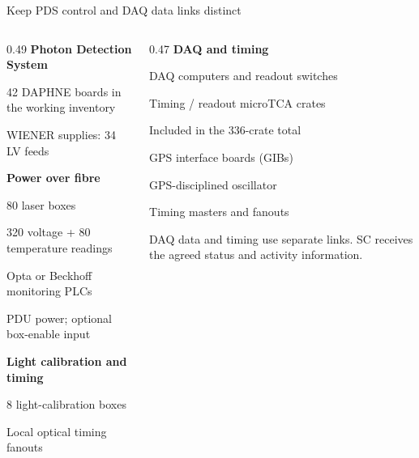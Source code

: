 \begin{frame}{Keep PDS control and DAQ data links distinct}
\small
\begin{columns}[T,onlytextwidth]
\begin{column}{0.49\textwidth}
\textbf{Photon Detection System}\par
\hspace*{0.8em}42 DAPHNE boards in the working inventory\par
\hspace*{0.8em}WIENER supplies: 34 LV feeds\par\medskip
\textbf{Power over fibre}\par
\hspace*{0.8em}80 laser boxes\par
\hspace*{1.6em}320 voltage + 80 temperature readings\par
\hspace*{0.8em}Opta or Beckhoff monitoring PLCs\par
\hspace*{0.8em}PDU power; optional box-enable input\par\medskip
\textbf{Light calibration and timing}\par
\hspace*{0.8em}8 light-calibration boxes\par
\hspace*{0.8em}Local optical timing fanouts
\end{column}
\begin{column}{0.47\textwidth}
\textbf{DAQ and timing}\par
\hspace*{0.8em}DAQ computers and readout switches\par
\hspace*{0.8em}Timing / readout microTCA crates\par
\hspace*{1.6em}Included in the 336-crate total\par
\hspace*{0.8em}GPS interface boards (GIBs)\par
\hspace*{0.8em}GPS-disciplined oscillator\par
\hspace*{0.8em}Timing masters and fanouts\par\bigskip
DAQ data and timing use separate links. SC receives the agreed status and activity information.
\end{column}
\end{columns}
\end{frame}

